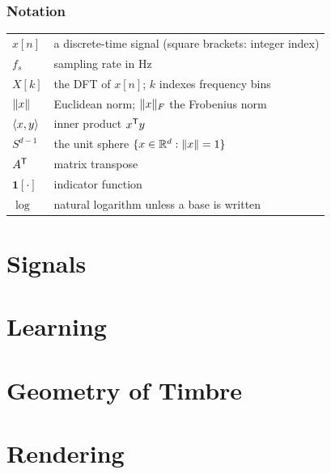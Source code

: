 \documentclass[11pt,oneside]{book}
\begin{document}
\section*{Notation}
\begin{center}
\begin{tabular}{ll}
\toprule
$x[n]$ & a discrete-time signal (square brackets: integer index) \\
$f_s$ & sampling rate in Hz \\
$X[k]$ & the DFT of $x[n]$; $k$ indexes frequency bins \\
$\lVert x\rVert$ & Euclidean norm; $\lVert x\rVert_F$ the Frobenius norm \\
$\langle x,y\rangle$ & inner product $x^{\mathsf{T}} y$ \\
$S^{d-1}$ & the unit sphere $\{x \in \mathbb{R}^d : \lVert x\rVert = 1\}$ \\
$A^{\mathsf{T}}$ & matrix transpose \\
$\mathbf{1}[\cdot]$ & indicator function \\
$\log$ & natural logarithm unless a base is written \\
\bottomrule
\end{tabular}
\end{center}

\mainmatter

\part{Signals}\label{part:signals}



\part{Learning}\label{part:learning}





\part{Geometry of Timbre}\label{part:geometry}



\part{Rendering}\label{part:rendering}


\appendix

\end{document}
